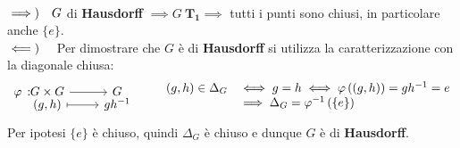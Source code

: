 \begin{demonstration}~{}\\
	$\implies)\quad G$ di \textbf{Hausdorff} $\implies G \ \mathbf{T_1} \implies$ tutti i punti sono chiusi, in particolare anche $\{e\}$. \\
	$\impliedby)\quad$ Per dimostrare che $G$ è di \textbf{Hausdorff} si utilizza la caratterizzazione con la diagonale chiusa:
		\begin{gather*}
			\funztot \phi {G\times G} G {(g,h)} {gh^{-1}} \qquad \begin{array}{ll}
				(g,h)\in\Delta_G &\iff g=h\iff \phi\left( (g,h)\right)=gh^{-1}=e \\
				&\implies \Delta_G =\phi^{-1}\left(\{e\}\right)
			\end{array}
		\end{gather*}
	Per ipotesi $\{e\}$ è chiuso, quindi $\Delta_G$ è chiuso e dunque $G$ è di \textbf{Hausdorff}.
\end{demonstration}

